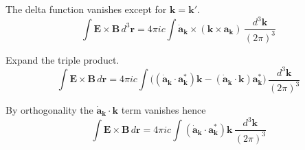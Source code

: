 The delta function vanishes except for $\mathbf k=\mathbf k'$.
\begin{equation*}
\int\mathbf E\times\mathbf B\,d^3\mathbf r
=4\pi ic\int\dot{\mathbf a}_{\mathbf k}\times(\mathbf k\times\mathbf a_{\mathbf k})
\,\frac{d^3\mathbf k}{(2\pi)^3}
\end{equation*}

Expand the triple product.
\begin{equation*}
\int\mathbf E\times\mathbf B\,d\mathbf r
=4\pi ic\int
\bigl((\dot{\mathbf a}_{\mathbf k}\cdot\mathbf a_{\mathbf k}^*)\mathbf k
-(\dot{\mathbf a}_{\mathbf k}\cdot\mathbf k)\mathbf a_{\mathbf k}^*\bigr)
\,\frac{d^3\mathbf k}{(2\pi)^3}
\end{equation*}

By orthogonality the $\dot{\mathbf a}_{\mathbf k}\cdot\mathbf k$
term vanishes hence
\begin{equation*}
\int\mathbf E\times\mathbf B\,d\mathbf r
=4\pi ic\int
(\dot{\mathbf a}_{\mathbf k}\cdot\mathbf a_{\mathbf k}^*)\mathbf k
\,\frac{d^3\mathbf k}{(2\pi)^3}
\end{equation*}


